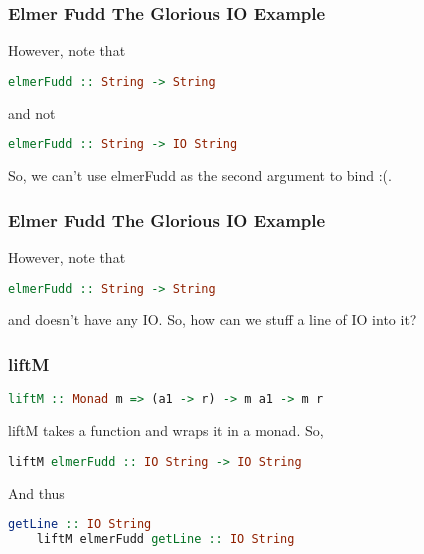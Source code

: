 \documentclass[presentation.tex]{subfiles}
\begin{document}
\begin{frame}[fragile]
  \frametitle{Elmer Fudd The Glorious IO Example}

  However, note that

  \begin{lstlisting}[frame=single,language=Haskell,breaklines=true]
    elmerFudd :: String -> String
  \end{lstlisting}

  and not

  \begin{lstlisting}[frame=single,language=Haskell,breaklines=true]
    elmerFudd :: String -> IO String
  \end{lstlisting}

  So, we can't use elmerFudd as the second argument to bind :(.
\end{frame}

\begin{frame}[fragile]
  \frametitle{Elmer Fudd The Glorious IO Example}

  However, note that

  \begin{lstlisting}[frame=single,language=Haskell,breaklines=true]
    elmerFudd :: String -> String
  \end{lstlisting}

  and doesn't have any IO. So, how can we stuff a line of IO into it?
\end{frame}

\begin{frame}[fragile]
  \frametitle{liftM}

  \begin{lstlisting}[frame=single,language=Haskell,breaklines=true]
    liftM :: Monad m => (a1 -> r) -> m a1 -> m r
  \end{lstlisting}

  liftM takes a function and wraps it in a monad. So,

  \begin{lstlisting}[frame=single,language=Haskell,breaklines=true]
    liftM elmerFudd :: IO String -> IO String
  \end{lstlisting}

  And thus

  \begin{lstlisting}[frame=single,language=Haskell,breaklines=true]
    getLine :: IO String
    liftM elmerFudd getLine :: IO String
  \end{lstlisting}
\end{frame}
\end{document}
